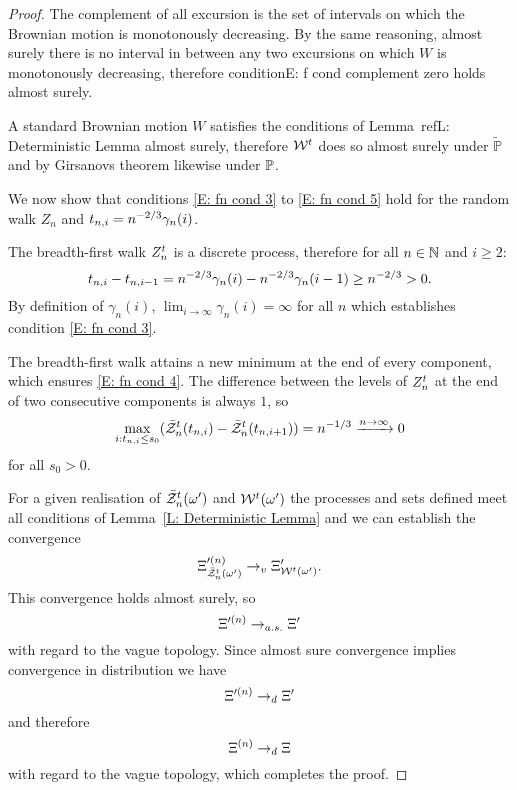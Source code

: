 \begin{proof}
	The complement of all excursion is the set of intervals
	on which the Brownian motion is monotonously decreasing.
	By the same reasoning, almost surely there is no interval in between any two excursions on which $W$ is monotonously decreasing,
	therefore condition{E: f cond complement zero} holds almost surely.
	
	A standard Brownian motion $W$ satisfies the conditions of Lemma~ref{L: Deterministic Lemma} almost surely,
	therefore $\mathcal{W}^t$ does so almost surely under $\tilde{\mathbb{P}}$
	and by Girsanovs theorem likewise under $\mathbb{P}$.  

	
	We now show that conditions 
	\eqref{E: fn cond 3} to \eqref{E: fn cond 5}
	hold for the random walk $Z_n$ and $t_{n,i} = n^{-2 / 3} \gamma_n(i)$.
	
	The breadth-first walk $Z_n^t$ is a discrete process, therefore for all $n \in \mathbb{N}$ and $i \geq 2$:
	\begin{equation}
		t_{n, i} - t_{n, i-1} = n^{-2 / 3}\gamma_n(i) - n^{-2 / 3}\gamma_n(i-1) \geq n^{-2 / 3} > 0.
	\end{equation}
	By definition of $\gamma_n(i)$,
	$\lim_{i \rightarrow \infty} \gamma_n(i) = \infty$ for all $n$
	which establishes condition \eqref{E: fn cond 3}.
	
	The breadth-first walk attains a new minimum at the end of every component,
	which ensures \eqref{E: fn cond 4}.
	The difference between the levels of $Z_n^t$ at the end of two consecutive components is always $1$,
	so 
	\begin{equation}
		\max_{i: t_{n, i} \leq s_0}(\bar{\mathcal{Z}}^t_n(t_{n, i}) - \bar{\mathcal{Z}}^t_n(t_{n, i+1})) = n^{-1 / 3} \xrightarrow{n \rightarrow \infty} 0
	\end{equation}
	for all $s_0 > 0$.
	
	
	For a given realisation of $\bar{\mathcal{Z}}^t_n(\omega')$ and $\mathcal{W}^t(\omega')$ 
	the processes and sets defined meet all conditions of Lemma~\ref{L: Deterministic Lemma}
	and we can establish the convergence
	\begin{equation}	
		\Xi^{\prime (n)}_{\bar{\mathcal{Z}}^t_n(\omega')} \rightarrow_v \Xi^{\prime}_{\mathcal{W}^t(\omega')}.
	\end{equation}
	This convergence holds almost surely, so
	\begin{equation}
		\Xi^{\prime (n)} \rightarrow_{a.s.} \Xi^{\prime}
	\end{equation}
	with regard to the vague topology.
	Since almost sure convergence implies convergence in distribution we have
	\begin{equation}
		\Xi^{\prime (n)} \rightarrow_d \Xi^{\prime}
	\end{equation}
	and therefore
	\begin{equation}
		\Xi^{(n)} \rightarrow_d \Xi
	\end{equation}
	with regard to the vague topology, which completes the proof.	
\end{proof}


